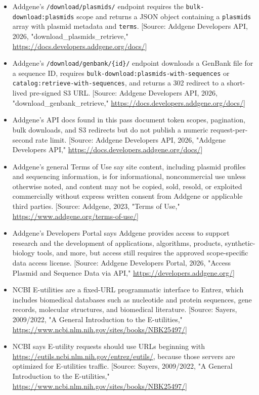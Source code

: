 \documentclass[11pt]{report}
\begin{document}
\begin{itemize}
\item Addgene's \texttt{/download/plasmids/} endpoint requires the \texttt{bulk-download:plasmids} scope and returns a JSON object containing a \texttt{plasmids} array with plasmid metadata and \texttt{terms}. [Source: Addgene Developers API, 2026, "download\_plasmids\_retrieve," \url{https://docs.developers.addgene.org/docs/}]
\item Addgene's \texttt{/download/genbank/\{id\}/} endpoint downloads a GenBank file for a sequence ID, requires \texttt{bulk-download:plasmids-with-sequences} or \texttt{catalog:retrieve-with-sequences}, and returns a 302 redirect to a short-lived pre-signed S3 URL. [Source: Addgene Developers API, 2026, "download\_genbank\_retrieve," \url{https://docs.developers.addgene.org/docs/}]
\item Addgene's API docs found in this pass document token scopes, pagination, bulk downloads, and S3 redirects but do not publish a numeric request-per-second rate limit. [Source: Addgene Developers API, 2026, "Addgene Developers API," \url{https://docs.developers.addgene.org/docs/}]
\item Addgene's general Terms of Use say site content, including plasmid profiles and sequencing information, is for informational, noncommercial use unless otherwise noted, and content may not be copied, sold, resold, or exploited commercially without express written consent from Addgene or applicable third parties. [Source: Addgene, 2023, "Terms of Use," \url{https://www.addgene.org/terms-of-use/}]
\item Addgene's Developers Portal says Addgene provides access to support research and the development of applications, algorithms, products, synthetic-biology tools, and more, but access still requires the approved scope-specific data access license. [Source: Addgene Developers Portal, 2026, "Access Plasmid and Sequence Data via API," \url{https://developers.addgene.org/}]
\item NCBI E-utilities are a fixed-URL programmatic interface to Entrez, which includes biomedical databases such as nucleotide and protein sequences, gene records, molecular structures, and biomedical literature. [Source: Sayers, 2009/2022, "A General Introduction to the E-utilities," \url{https://www.ncbi.nlm.nih.gov/sites/books/NBK25497/}]
\item NCBI says E-utility requests should use URLs beginning with \url{https://eutils.ncbi.nlm.nih.gov/entrez/eutils/}, because those servers are optimized for E-utilities traffic. [Source: Sayers, 2009/2022, "A General Introduction to the E-utilities," \url{https://www.ncbi.nlm.nih.gov/sites/books/NBK25497/}]

\end{itemize}
\end{document}
